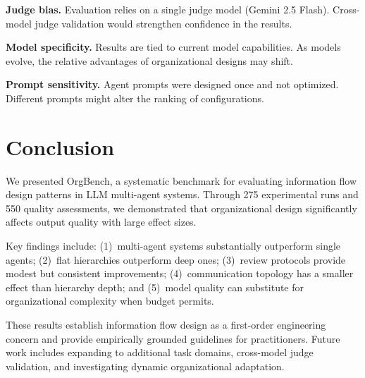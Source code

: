 \documentclass[conference]{IEEEtran}
\begin{document}
\textbf{Judge bias.}
Evaluation relies on a single judge model (Gemini 2.5 Flash).
Cross-model judge validation would strengthen confidence in the results.

\textbf{Model specificity.}
Results are tied to current model capabilities.
As models evolve, the relative advantages of organizational designs may shift.

\textbf{Prompt sensitivity.}
Agent prompts were designed once and not optimized.
Different prompts might alter the ranking of configurations.

\section{Conclusion}
\label{sec:conclusion}

We presented OrgBench, a systematic benchmark for evaluating information flow design patterns in LLM multi-agent systems.
Through 275 experimental runs and 550 quality assessments, we demonstrated that organizational design significantly affects output quality with large effect sizes.

Key findings include:
(1)~multi-agent systems substantially outperform single agents;
(2)~flat hierarchies outperform deep ones;
(3)~review protocols provide modest but consistent improvements;
(4)~communication topology has a smaller effect than hierarchy depth;
and (5)~model quality can substitute for organizational complexity when budget permits.

These results establish information flow design as a first-order engineering concern and provide empirically grounded guidelines for practitioners.
Future work includes expanding to additional task domains, cross-model judge validation, and investigating dynamic organizational adaptation.



\end{document}
